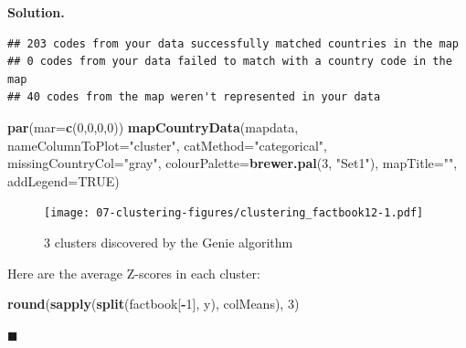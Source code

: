 \documentclass[10pt,b5paper,krantz1]{krantz}
\newenvironment{Shaded}{\begin{snugshade}}{\end{snugshade}}
\newcommand{\DataTypeTok}[1]{\textcolor[rgb]{0.27,0.27,0.27}{#1}}
\newcommand{\DecValTok}[1]{\textcolor[rgb]{0.06,0.06,0.06}{#1}}
\newcommand{\KeywordTok}[1]{\textcolor[rgb]{0.27,0.27,0.27}{\textbf{#1}}}
\newcommand{\NormalTok}[1]{#1}
\newcommand{\OperatorTok}[1]{\textcolor[rgb]{0.43,0.43,0.43}{\textbf{#1}}}
\newcommand{\OtherTok}[1]{\textcolor[rgb]{0.37,0.37,0.37}{#1}}
\newcommand{\StringTok}[1]{\textcolor[rgb]{0.5,0.5,0.5}{#1}}
\newenvironment{solution}{%
\bigskip\noindent\textbf{Solution. }%
\it\ignorespaces%
\ignorespaces%
}{\ignorespaces%
\hfill$\blacksquare$%
}
\begin{document}
\begin{solution}
\begin{verbatim}
## 203 codes from your data successfully matched countries in the map
## 0 codes from your data failed to match with a country code in the map
## 40 codes from the map weren't represented in your data
\end{verbatim}

\begin{Shaded}
\begin{Highlighting}[]
\KeywordTok{par}\NormalTok{(}\DataTypeTok{mar=}\KeywordTok{c}\NormalTok{(}\DecValTok{0}\NormalTok{,}\DecValTok{0}\NormalTok{,}\DecValTok{0}\NormalTok{,}\DecValTok{0}\NormalTok{))}
\KeywordTok{mapCountryData}\NormalTok{(mapdata, }\DataTypeTok{nameColumnToPlot=}\StringTok{"cluster"}\NormalTok{,}
    \DataTypeTok{catMethod=}\StringTok{"categorical"}\NormalTok{, }\DataTypeTok{missingCountryCol=}\StringTok{"gray"}\NormalTok{,}
    \DataTypeTok{colourPalette=}\KeywordTok{brewer.pal}\NormalTok{(}\DecValTok{3}\NormalTok{, }\StringTok{"Set1"}\NormalTok{),}
    \DataTypeTok{mapTitle=}\StringTok{""}\NormalTok{, }\DataTypeTok{addLegend=}\OtherTok{TRUE}\NormalTok{)}
\end{Highlighting}
\end{Shaded}

\begin{figure}
\hypertarget{fig:clustering_factbook12}{%
\centering
\texttt{[image: 07-clustering-figures/clustering\_factbook12-1.pdf]}
\caption{3 clusters discovered by the Genie algorithm}\label{fig:clustering_factbook12}
}
\end{figure}

Here are the average Z-scores in each cluster:

\begin{Shaded}
\begin{Highlighting}[]
\KeywordTok{round}\NormalTok{(}\KeywordTok{sapply}\NormalTok{(}\KeywordTok{split}\NormalTok{(factbook[}\OperatorTok{-}\DecValTok{1}\NormalTok{], y), colMeans), }\DecValTok{3}\NormalTok{)}
\end{Highlighting}
\end{Shaded}


\end{solution}
\end{document}
